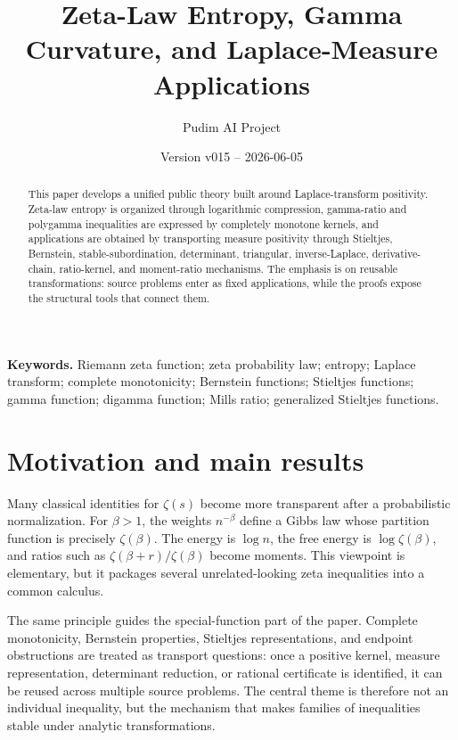 \documentclass[11pt]{article}
\title{Zeta-Law Entropy, Gamma Curvature, and Laplace-Measure Applications}
\author{Pudim AI Project}
\date{Version v015 -- 2026-06-05}
\numberwithin{equation}{section}
\theoremstyle{definition}
\theoremstyle{remark}
\newcommand{\1}{\mathbf 1}
\begin{document}
\maketitle

\begin{abstract}
This paper develops a unified public theory built around Laplace-transform
positivity.  Zeta-law entropy is organized through logarithmic compression,
gamma-ratio and polygamma inequalities are expressed by completely monotone
kernels, and applications are obtained by transporting measure positivity
through Stieltjes, Bernstein, stable-subordination, determinant, triangular,
inverse-Laplace, derivative-chain, ratio-kernel, and moment-ratio mechanisms.
The emphasis is on reusable transformations: source problems enter as fixed
applications, while the proofs expose the structural tools that connect them.
\end{abstract}

\tableofcontents

\medskip



\noindent\textbf{Keywords.} Riemann zeta function; zeta probability law; entropy; Laplace transform; complete monotonicity; Bernstein functions; Stieltjes functions; gamma function; digamma function; Mills ratio; generalized Stieltjes functions.

\section{Motivation and main results}

Many classical identities for \(\zeta(s)\) become more transparent after a
probabilistic normalization.  For \(\beta>1\), the weights \(n^{-\beta}\)
define a Gibbs law whose partition function is precisely \(\zeta(\beta)\).
The energy is \(\log n\), the free energy is \(\log\zeta(\beta)\), and ratios
such as \(\zeta(\beta+r)/\zeta(\beta)\) become moments.  This viewpoint is
elementary, but it packages several unrelated-looking zeta inequalities into a
common calculus.

The same principle guides the special-function part of the paper.  Complete
monotonicity, Bernstein properties, Stieltjes representations, and endpoint
obstructions are treated as transport questions: once a positive kernel,
measure representation, determinant reduction, or rational certificate is
identified, it can be reused across multiple source problems.  The central
theme is therefore not an individual inequality, but the mechanism that makes
families of inequalities stable under analytic transformations.
\end{document}
